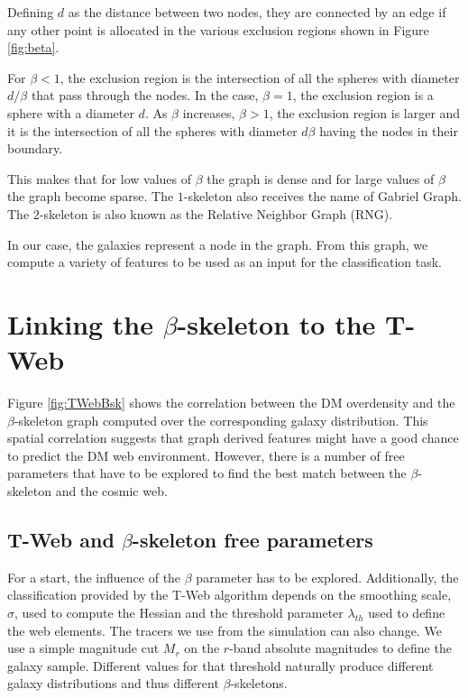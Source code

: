 \documentclass[usenatbib]{mnras}
\begin{document}
Defining $d$ as the distance between two nodes, they are connected by
an edge if any other point is allocated in the various exclusion
regions shown in Figure \ref{fig:beta}.  

For $\beta<1$, the exclusion region is the intersection of all the
spheres with diameter $d/\beta$ that pass through the nodes. In the
case, $\beta=1$, the exclusion region is a sphere with a diameter $d$.
As $\beta$ increases, $\beta>1$, the exclusion region is larger and it
is the intersection of all the spheres with diameter $d\beta$ having
the nodes in their boundary.  

This makes that for low values of $\beta$ the graph is dense and for
large values of $\beta$ the graph become sparse. 
The $1$-skeleton also receives the name of Gabriel Graph.  
The $2$-skeleton is also known as the Relative Neighbor Graph (RNG).

In our case, the galaxies represent a node in the graph.
From this graph, we compute a variety of features to be used as an input for the classification task.



\section{Linking the $\beta$-skeleton to the T-Web}\label{sec:link}

Figure \ref{fig:TWebBsk} shows the correlation between the DM overdensity
and the $\beta$-skeleton graph computed over the corresponding galaxy
distribution. 
This spatial correlation suggests that graph derived features might have
a good chance to predict the DM web environment. 
However, there is a number of free parameters that have to be explored
to find the best match between the $\beta$-skeleton and the cosmic web.

\subsection{T-Web and $\beta$-skeleton free parameters}

For a start, the influence of the $\beta$ parameter has to be explored.
Additionally, the classification provided by the T-Web algorithm
depends on the smoothing scale, $\sigma$, used to compute the Hessian and the
threshold parameter $\lambda_{th}$ used to define the web elements.
The tracers we use from the simulation can also change. 
We use a simple magnitude cut $M_{r}$ on the $r$-band absolute magnitudes
to define the galaxy sample. 
Different values for that threshold naturally produce different galaxy
distributions and thus different $\beta$-skeletons. 
\end{document}
